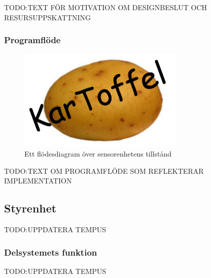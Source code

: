 \documentclass{article}
\begin{document}
TODO:TEXT FÖR MOTIVATION OM DESIGNBESLUT OCH RESURSUPPSKATTNING


\subsubsection{Programflöde}

\begin{figure}[H]
\centering
\includegraphics[scale=0.6]{Logo}
\caption{Ett flödesdiagram över sensorenhetens tillstånd}
\label{fig:sensorenhet_flowchart}
\end{figure}
TODO:TEXT OM PROGRAMFLÖDE SOM REFLEKTERAR IMPLEMENTATION

\subsection{Styrenhet}
TODO:UPPDATERA TEMPUS

\subsubsection{Delsystemets funktion}
TODO:UPPDATERA TEMPUS
\end{document}

